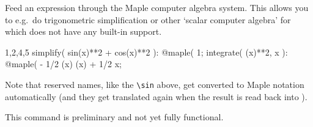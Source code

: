 
Feed an expression through the Maple computer algebra system. This
allows you to e.g.~do trigonometric simplification or other `scalar
computer algebra' for which \cdb does not have any built-in support.
\begin{screen}{1,2,4,5}
simplify( sin(x)**2 + cos(x)**2 ):
@maple(%
1;
integrate( \sin(x)**2, x ):
@maple(%
- 1/2 \sin(x) \cos(x) + 1/2 x;
\end{screen}
Note that reserved names, like the \verb|\sin| above, get converted to
Maple notation automatically (and they get translated again when
the result is read back into \cdb).

This command is preliminary and not yet fully functional.


